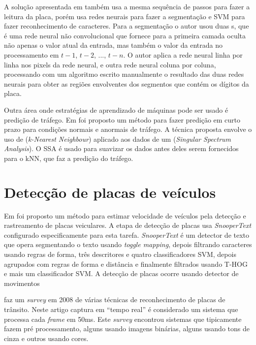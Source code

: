 A solução apresentada em
 também usa a mesma sequência de
passos para fazer a leitura da placa, porém usa redes neurais para 
fazer a segmentação e SVM para fazer reconhecimento de caracteres. Para a
segmentação o autor usou duas
s, que é uma rede neural não convolucional que
fornece para a primeira camada oculta não apenas o valor atual da entrada, mas
também o valor da entrada no processamento em $t-1$, $t-2$, ..., $t-n$. O autor
aplica a rede neural linha por linha nos pixels da rede neural, e outra rede
neural coluna por coluna, processando com um algoritmo escrito manualmente o
resultado das duas redes neurais para obter as regiões envolventes dos
segmentos que contém os dígitos da placa.

Outra área onde estratégias de aprendizado de máquinas pode ser usado é
predição de tráfego. Em  foi proposto um método para
fazer
predição em curto prazo para condições normais e anormais de tráfego. A técnica
proposta envolve o uso de  (\emph{k-Nearest Neighbour}) aplicado aos dados de um
(\emph{Singular Spectrum Analysis}). O SSA é usado para suavizar os dados antes
deles serem fornecidos para o kNN, que faz a predição do tráfego.

\section{Detecção de placas de veículos}

Em  foi proposto um método para estimar velocidade de
veículos pela detecção e rastreamento de placas veiculares. A etapa de detecção
de placas usa \emph{SnooperText} \cite{minetto.10.icip} configurado
especificamente para esta tarefa. \emph{SnooperText} é um detector de texto
que opera segmentando o texto usando \emph{toggle mapping}, depois filtrando
caracteres usando regras de forma, três descritores e quatro classificadores
SVM, depois agrupados com regras de forma e distância e finalmente
filtrados usando T-HOG e mais um classificador SVM. A detecção de placas ocorre
usando detector de movimentos

 faz um \emph{survey} em 2008 de
várias técnicas de reconhecimento de placas de trânsito. Neste artigo
captura em ``tempo real'' é considerado um sistema que processa cada
\emph{frame} em 50ms. Este \emph{survey} encontrou sistemas 
que tipicamente fazem pré processamento, alguns usando imagens binárias,
alguns usando tons de cinza e outros usando cores.

